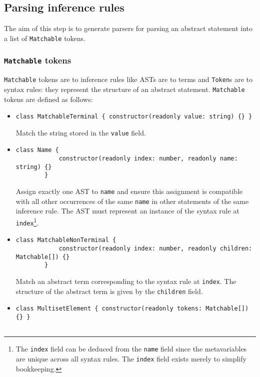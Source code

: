 \subsection{Parsing inference rules}
\label{inference:parsing}
The aim of this step is to generate parsers for parsing an abstract statement into a list of \lstinline{Matchable} tokens.

\subsubsection{\texorpdfstring{\lstinline{Matchable}}{Matchable} tokens}
\lstinline{Matchable} tokens are to inference rules like ASTs are to terms and \lstinline{Token}s are to syntax rules: they represent the structure of an abstract statement. \lstinline{Matchable} tokens are defined as follows:
\begin{itemize}
    \item \begin{lstlisting}[style=ds]
        class MatchableTerminal { constructor(readonly value: string) {} }
    \end{lstlisting}
    Match the string stored in the \lstinline{value} field.
    \item \begin{lstlisting}[style=ds]
        class Name {
            constructor(readonly index: number, readonly name: string) {}
        }
    \end{lstlisting}
    Assign exactly one AST to \lstinline{name} and ensure this assignment is compatible with all other occurrences of the same \lstinline{name} in other statements of the same inference rule. The AST must represent an instance of the syntax rule at \lstinline{index}\footnote{The \lstinline{index} field can be deduced from the \lstinline{name} field since the metavariables are unique across all syntax rules. The \lstinline{index} field exists merely to simplify bookkeeping.}.
    \item \begin{lstlisting}[style=ds]
        class MatchableNonTerminal {
            constructor(readonly index: number, readonly children: Matchable[]) {}
        }
    \end{lstlisting}
    Match an abstract term corresponding to the syntax rule at \lstinline{index}. The structure of the abstract term is given by the \lstinline{children} field.
    \item \begin{lstlisting}[style=ds]
        class MultisetElement { constructor(readonly tokens: Matchable[]) {} }


\end{lstlisting}
\end{itemize}
